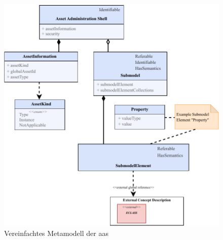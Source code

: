 

\newpage
\begin{figure}[htbp]
    \centering
    \includegraphics[width=1\textwidth]{Bilder/Metamodell/MetamodellFarbig.pdf}
    \caption{Vereinfachtes Metamodell der \acs{aas}}
    \label{fig:MetamodellAAS}
\end{figure}

